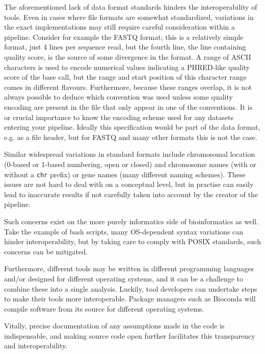 \begin{justify}
The aforementioned lack of data format standards hinders the interoperability of tools. Even in cases where file formats are somewhat standardized, variations in the exact implementations may still require careful consideration within a pipeline. Consider for example the FASTQ format; this is a relatively simple format, just 4 lines per sequence read, but the fourth line, the line containing quality score, is the source of some divergence in the format. A range of ASCII characters is used to encode numerical values indicating a PHRED-like quality score of the base call, but the range and start position of this character range comes in different flavours. Furthermore, because these ranges overlap, it is not always possible to deduce which convention was used unless some quality encoding are present in the file that only appear in one of the conventions. It is or crucial importance to know the encoding scheme used for any datasets entering your pipeline. Ideally this specification would be part of the data format, e.g. as a file header, but for FASTQ and many other formats this is not the case.

Similar widespread variations in standard formats include chromosomal location (0-based or 1-based numbering, open or closed) and chromosome names (with or without a \verb+chr+ prefix) or gene names (many different naming schemes). These issues are not hard to deal with on a conceptual level, but in practise can easily lead to inaccurate results if not carefully taken into account by the creator of the pipeline.

Such concerns exist on the more purely informatics side of bioinformatics as well. Take the example of bash scripts, many OS-dependent syntax variations can hinder interoperability, but by taking care to comply with POSIX standards, such concerns can be mitigated.

Furthermore, different tools may be written in different programming languages and/or designed for different operating systems, and it can be a challenge to combine these into a single analysis. Luckily, tool developers can undertake steps to make their tools more interoperable. Package managers such as Bioconda \cite{gruning2017bioconda} will compile software from its source for different operating systems.

Vitally, precise documentation of any assumptions made in the code is indispensable, and making source code open further facilitates this transparency and interoperability.


\end{justify}
